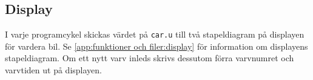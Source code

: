 \subsection{Display}

I varje programcykel skickas värdet på \texttt{car.u} till två stapeldiagram på
displayen för vardera bil. Se \ref{app:funktioner och filer:display} för information om displayens
stapeldiagram. Om ett nytt varv inleds skrivs dessutom förra varvnumret och
varvtiden ut på displayen.
